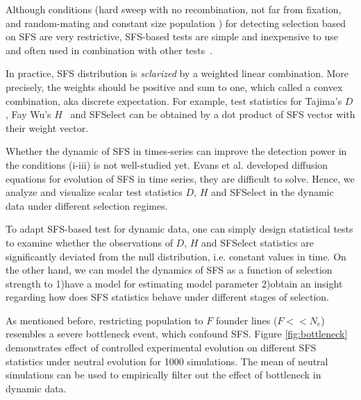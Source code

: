 \documentclass[11pt]{article}
\begin{document}
Although conditions (hard sweep with no recombination, not 
far from 
fixation, and random-mating and constant size population ) 
for detecting 
selection based on SFS are very restrictive, SFS-based tests 
are simple and 
inexpensive to use and often used in combination with 
other tests~\cite{}. 

In practice, SFS distribution is \emph{sclarized} by a 
weighted 
linear combination\cite{achaz2009frequency}. More precisely, 
the weights should be positive and sum to 
one, which called a convex combination, aka discrete 
expectation. For 
example, 
test statistics for Tajima's $D$\cite{tajima1989statistical}, 
Fay Wu's $H$~\cite{fay2000hitchhiking} and 
SFSelect\cite{ronen2013learning} can be obtained by a dot 
product of SFS vector with their weight vector. 

Whether the dynamic of SFS in times-series can improve the detection power in 
the conditions (i-iii) is not well-studied yet. Evans et al. 
\cite{evans2007non} developed diffusion equations for 
evolution of SFS in time series, they are difficult to solve. 
Hence, we analyze and visualize scalar test statistics $D$, $H$ and SFSelect 
in the dynamic data under different selection regimes.

To adapt SFS-based test for dynamic data, one can simply design statistical 
tests to examine whether the 
observations of $D$, $H$ and SFSelect statistics are 
significantly deviated 
from the null distribution, i.e. constant values in time.
On the other hand, we can model the dynamics of SFS as a 
function of selection 
strength to 1)have a model for estimating model parameter 2)obtain an insight 
regarding how does SFS statistics behave under different 
stages of selection.

As mentioned before, restricting population to $F$ founder lines ($F<<N_e$) 
resembles a severe bottleneck event, which confound SFS. Figure 
\ref{fig:bottleneck} demonstrates effect of controlled experimental evolution 
on different SFS statistics under neutral evolution for 1000 simulations. The 
mean of 
neutral simulations can be used to empirically filter out the effect of 
bottleneck in dynamic data. 
\end{document}
